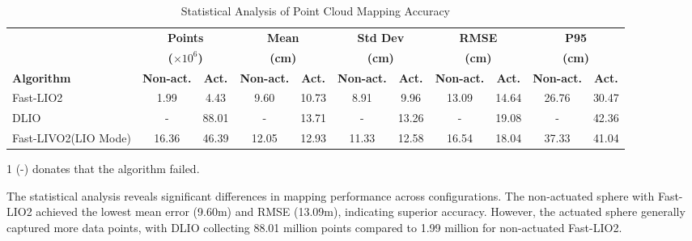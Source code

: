 \documentclass[conference]{IEEEtran}
\begin{document}
\begin{table}
\centering
\begin{threeparttable}
\caption{Statistical Analysis of Point Cloud Mapping Accuracy}
\label{tab:point_cloud_error}
\begin{tabular}{l|cc|cc|cc|cc|cc}
\toprule
& \multicolumn{2}{c|}{\textbf{Points}} & \multicolumn{2}{c|}{\textbf{Mean}} & \multicolumn{2}{c|}{\textbf{Std Dev}} & \multicolumn{2}{c|}{\textbf{RMSE}} & \multicolumn{2}{c}{\textbf{P95}} \\
& \multicolumn{2}{c|}{\textbf{($\times 10^6$)}} & \multicolumn{2}{c|}{\textbf{(cm)}} & \multicolumn{2}{c|}{\textbf{(cm)}} & \multicolumn{2}{c|}{\textbf{(cm)}} & \multicolumn{2}{c}{\textbf{(cm)}} \\
\cmidrule(r){2-3} \cmidrule(lr){4-5} \cmidrule(lr){6-7} \cmidrule(lr){8-9} \cmidrule(l){10-11}
\textbf{Algorithm} & \textbf{Non-act.} & \textbf{Act.} & \textbf{Non-act.} & \textbf{Act.} & \textbf{Non-act.} & \textbf{Act.} & \textbf{Non-act.} & \textbf{Act.} & \textbf{Non-act.} & \textbf{Act.} \\
\midrule
Fast-LIO2 & 1.99 & 4.43 & 9.60 & 10.73 & 8.91 & 9.96 & 13.09 & 14.64 & 26.76 & 30.47 \\
DLIO & - & 88.01 & - & 13.71 & - & 13.26 & - & 19.08 & - & 42.36 \\
Fast-LIVO2(LIO Mode) & 16.36 & 46.39 & 12.05 & 12.93 & 11.33 & 12.58 & 16.54 & 18.04 & 37.33 & 41.04 \\
\bottomrule
\end{tabular}
\begin{tablenotes}
    \item[1] (-) donates that the algorithm failed. %
\end{tablenotes}
\end{threeparttable}
\end{table}

The statistical analysis reveals significant differences in mapping performance across configurations. 
The non-actuated sphere with Fast-LIO2 achieved the lowest mean error (9.60m) and RMSE (13.09m), indicating superior accuracy. 
However, the actuated sphere generally captured more data points, with DLIO collecting 88.01 million points compared to 1.99 million for non-actuated Fast-LIO2. 
\end{document}
